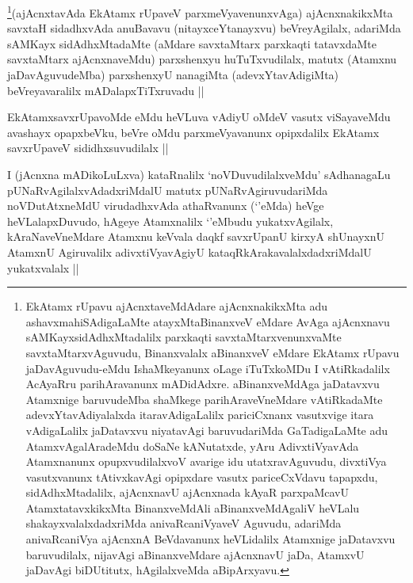 \begin{artha}
\footnote{EkAtamx rUpavu ajAcnxtaveMdAdare ajAcnxnakikxMta adu ashavxmahiSAdigaLaMte atayxMtaBinanxveV eMdare AvAga ajAcnxnavu sAMKayxsidAdhxMtadalilx parxkaqti savxtaMtarxvenunxvaMte savxtaMtarxvAguvudu, Binanxvalalx aBinanxveV eMdare EkAtamx rUpavu jaDavAguvudu-eMdu IshaMkeyanunx oLage iTuTxkoMDu I vAtiRkadalilx AcAyaRru parihAravanunx mADidAdxre. aBinanxveMdAga jaDatavxvu Atamxnige baruvudeMba shaMkege parihAraveVneMdare vAtiRkadaMte adevxYtavAdiyalalxda itaravAdigaLalilx pariciCxnanx vasutxvige itara vAdigaLalilx jaDatavxvu niyatavAgi baruvudariMda GaTadigaLaMte adu AtamxvAgalAradeMdu doSaNe kANutatxde, yAru AdivxtiVyavAda Atamxnanunx opupxvudilalxvoV avarige idu utatxravAguvudu, divxtiVya vasutxvanunx tAtivxkavAgi opipxdare vasutx pariceCxVdavu tapapxdu, sidAdhxMtadalilx, ajAcnxnavU ajAcnxnada kAyaR parxpaMcavU AtamxtatavxkikxMta BinanxveMdAli aBinanxveMdAgaliV heVLalu shakayxvalalxdadxriMda anivaRcaniVyaveV Aguvudu, adariMda anivaRcaniVya ajAcnxnA BeVdavanunx heVLidalilx Atamxnige jaDatavxvu baruvudilalx, nijavAgi aBinanxveMdare ajAcnxnavU jaDa, AtamxvU jaDavAgi biDUtitutx, hAgilalxveMda aBipArxyavu.}(ajAcnxtavAda EkAtamx rUpaveV parxmeVyavenunxvAga) ajAcnxnakikxMta savxtaH sidadhxvAda anuBavavu (nitayxceYtanayxvu) beVreyAgilalx, adariMda sAMKayx sidAdhxMtadaMte (aMdare savxtaMtarx parxkaqti tatavxdaMte savxtaMtarx ajAcnxnaveMdu) parxshenxyu huTuTxvudilalx, matutx (Atamxnu jaDavAguvudeMba) parxshenxyU nanagiMta (adevxYtavAdigiMta) beVreyavaralilx mADalapxTiTxruvadu ||
\end{artha}


\begin{artha}
EkAtamxsavxrUpavoMde eMdu heVLuva vAdiyU oMdeV vasutx viSayaveMdu avashayx opapxbeVku, beVre oMdu parxmeVyavanunx opipxdalilx EkAtamx savxrUpaveV sididhxsuvudilalx ||
\end{artha}

\begin{artha}
I (jAcnxna mADikoLuLxva) kataRnalilx `noVDuvudilalxveMdu' sAdhanagaLu pUNaRvAgilalxvAdadxriMdalU matutx pUNaRvAgiruvudariMda noVDutAtxneMdU virudadhxvAda athaRvanunx (`\stext'eMda) heVge heVLalapxDuvudo, hAgeye Atamxnalilx `\stext'eMbudu yukatxvAgilalx, kAraNaveVneMdare Atamxnu keVvala daqkf savxrUpanU kirxyA shUnayxnU AtamxnU Agiruvalilx adivxtiVyavAgiyU kataqRkArakavalalxdadxriMdalU yukatxvalalx ||
\end{artha}

